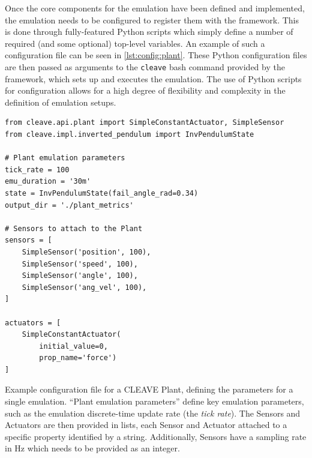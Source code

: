 Once the core components for the emulation have been defined and implemented, the emulation needs to be configured to register them with the framework.
This is done through fully-featured Python scripts which simply define a number of required (and some optional) top-level variables.
An example of such a configuration file can be seen in \cref{lst:config:plant}.
These Python configuration files are then passed as arguments to the \texttt{cleave} bash command provided by the framework, which sets up and executes the emulation.
The use of Python scripts for configuration allows for a high degree of flexibility and complexity in the definition of emulation setups.

\begin{listing}
    \begin{verbatim}
from cleave.api.plant import SimpleConstantActuator, SimpleSensor
from cleave.impl.inverted_pendulum import InvPendulumState

# Plant emulation parameters
tick_rate = 100
emu_duration = '30m'
state = InvPendulumState(fail_angle_rad=0.34)
output_dir = './plant_metrics'

# Sensors to attach to the Plant
sensors = [
    SimpleSensor('position', 100),
    SimpleSensor('speed', 100),
    SimpleSensor('angle', 100),
    SimpleSensor('ang_vel', 100),
]

actuators = [
    SimpleConstantActuator(
        initial_value=0,
        prop_name='force')
]
    \end{verbatim}
    \caption{
        Example configuration file for a CLEAVE Plant, defining the parameters for a single emulation.
        ``Plant emulation parameters'' define key emulation parameters, such as the emulation discrete-time update rate (the \emph{tick rate}).
        The Sensors and Actuators are then provided in lists, each Sensor and Actuator attached to a specific property identified by a string.
        Additionally, Sensors have a sampling rate in Hz which needs to be provided as an integer.
    }
    \label{lst:config:plant}
\end{listing}